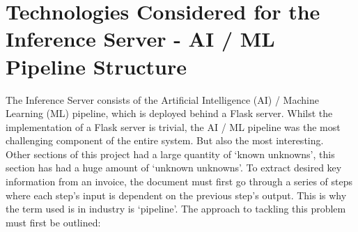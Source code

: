 \section{Technologies Considered for the Inference Server - AI / ML Pipeline Structure}
\label{sec:technologies}
The Inference Server consists of the Artificial Intelligence  (AI) / Machine Learning (ML) pipeline, which is deployed behind a Flask server.
Whilst the implementation of a Flask server is trivial, the AI / ML pipeline was the most challenging component of the entire system. But also
the most interesting.\\
Other sections of this project had a large quantity of `known unknowns', this section has had a huge amount of `unknown unknowns'.
To extract desired key information from an invoice, the document must first go
through a series of steps where each step's input is dependent on the previous step's output. This is why the term used is in industry is
`pipeline'. The approach to tackling this problem must first be outlined:

